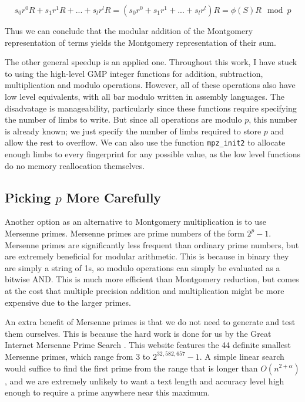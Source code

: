 \documentclass[ %
                    author={Dominic Joseph Moylett},
                    degree={MEng},
                     title={Dictionary Matching with Fingerprints},
                  subtitle={An Empirical Analysis},
                      type={research},
                      year={2015} ]{dissertation}
\begin{document}
$$s_0r^0R + s_1r^1R + ... + s_lr^lR = (s_0r^0 + s_1r^1 + ... + s_lr^l)R = \phi(S)R \mod p$$

Thus we can conclude that the modular addition of the Montgomery representation of terms yields the Montgomery representation of their sum.

The other general speedup is an applied one. Throughout this work, I have stuck to using the high-level GMP integer functions for addition, subtraction, multiplication and modulo operations. However, all of these operations also have low level equivalents, with all bar modulo written in assembly languages. The disadvatage is manageability, particularly since these functions require specifying the number of limbs to write. But since all operations are modulo $p$, this number is already known; we just specify the number of limbs required to store $p$ and allow the rest to overflow. We can also use the function \texttt{mpz\_init2} to allocate enough limbs to every fingerprint for any possible value, as the low level functions do no memory reallocation themselves.

\subsection{Picking $p$ More Carefully}
\label{ssec:pick-p}

Another option as an alternative to Montgomery multiplication is to use Mersenne primes. Mersenne primes are prime numbers of the form $2^p - 1$. Mersenne primes are significantly less frequent than ordinary prime numbers, but are extremely beneficial for modular arithmetic. This is because in binary they are simply a string of 1s, so modulo operations can simply be evaluated as a bitwise AND. This is much more efficient than Montgomery reduction, but comes at the cost that multiple precision addition and multiplication might be more expensive due to the larger primes.

An extra benefit of Mersenne primes is that we do not need to generate and test them ourselves. This is because the hard work is done for us by the Great Internet Mersenne Prime Search \cite{website:gimps-known}. This website features the 44 definite smallest Mersenne primes, which range from 3 to $2^{32,582,657}-1$. A simple linear search would suffice to find the first prime from the range that is longer than $O(n^{2 + \alpha})$, and we are extremely unlikely to want a text length and accuracy level high enough to require a prime anywhere near this maximum.
\end{document}
